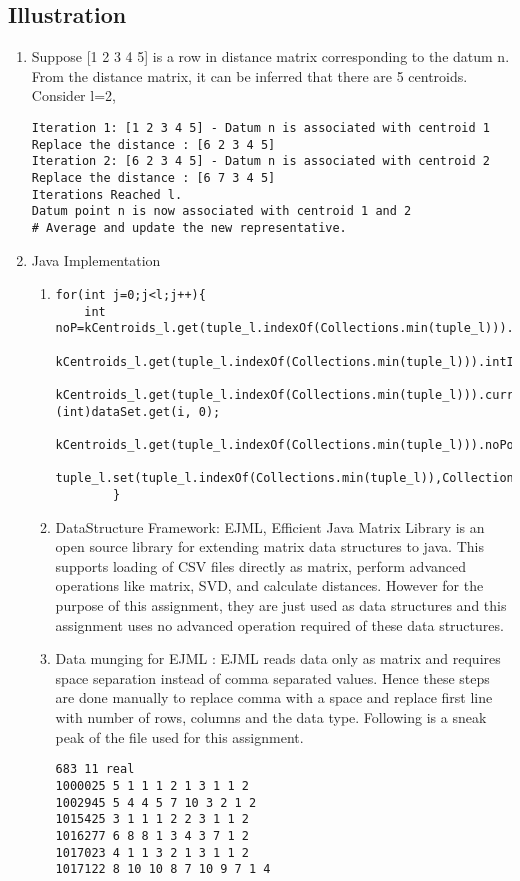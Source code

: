 \documentclass{article}
\begin{document}
\subsection*{Illustration}
\begin{enumerate}
\item Suppose [1 2 3 4 5] is a row in distance matrix corresponding to the datum n.\\
From the distance matrix, it can be inferred that there are 5 centroids. Consider l=2,
\begin{verbatim}
Iteration 1: [1 2 3 4 5] - Datum n is associated with centroid 1
Replace the distance : [6 2 3 4 5]
Iteration 2: [6 2 3 4 5] - Datum n is associated with centroid 2
Replace the distance : [6 7 3 4 5]
Iterations Reached l.
Datum point n is now associated with centroid 1 and 2
# Average and update the new representative.
\end{verbatim}
\item Java Implementation
\begin{enumerate}
\item
\begin{verbatim}
for(int j=0;j<l;j++){
	int noP=kCentroids_l.get(tuple_l.indexOf(Collections.min(tuple_l))).noPoints;
	kCentroids_l.get(tuple_l.indexOf(Collections.min(tuple_l))).intIndex[noP]=i;
	kCentroids_l.get(tuple_l.indexOf(Collections.min(tuple_l))).currPoints[noP]=(int)dataSet.get(i, 0);
	kCentroids_l.get(tuple_l.indexOf(Collections.min(tuple_l))).noPoints++;
	tuple_l.set(tuple_l.indexOf(Collections.min(tuple_l)),Collections.max(tuple_l)+1);
		}
\end{verbatim}
\item DataStructure Framework: EJML, Efficient Java Matrix Library is an open source library for extending matrix data structures to java. This supports loading of CSV files directly as matrix, perform advanced operations like matrix, SVD, and calculate distances. However for the purpose of this assignment, they are just used as data structures and this assignment uses no advanced operation required of these data structures.
\item Data munging for EJML : EJML reads data only as matrix and requires space separation instead of comma separated values. Hence these steps are done manually to replace comma with a space and replace first line with number of rows, columns and the data type. Following is a sneak peak of the file used for this assignment.
\begin{verbatim}
683 11 real
1000025 5 1 1 1 2 1 3 1 1 2
1002945 5 4 4 5 7 10 3 2 1 2
1015425 3 1 1 1 2 2 3 1 1 2
1016277 6 8 8 1 3 4 3 7 1 2
1017023 4 1 1 3 2 1 3 1 1 2
1017122 8 10 10 8 7 10 9 7 1 4


\end{verbatim}
\end{enumerate}
\end{enumerate}
\end{document}
